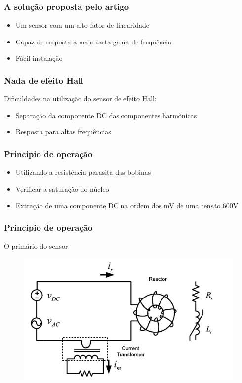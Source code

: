 \documentclass{beamer}
\begin{document}
\begin{frame}
    \frametitle{A solução proposta pelo artigo}

    \begin{itemize}
        \item Um sensor com um alto fator de linearidade
        \item Capaz de resposta a mais vasta gama de frequência
        \item Fácil instalação
    \end{itemize}
\end{frame}

\begin{frame}
    \frametitle{Nada de efeito Hall}
    
    Dificuldades na utilização do sensor de efeito Hall:
    \begin{itemize}
        \item Separação da componente DC das componentes harmônicas
        \item Resposta para altas frequências
    \end{itemize}
\end{frame}

\begin{frame}
    \frametitle{Principio de operação}
    
    \begin{itemize}
        \item Utilizando a resistência parasita das bobinas
        \item Verificar a saturação do núcleo
        \item Extração de uma componente DC na ordem dos mV de uma tensão 600V
    \end{itemize}
\end{frame}

\begin{frame}
    \frametitle{Principio de operação}

    O primário do sensor
    \begin{figure}
        \includegraphics[width=.8\linewidth]{fig1.png}
    \end{figure}
\end{frame}
\end{document}
